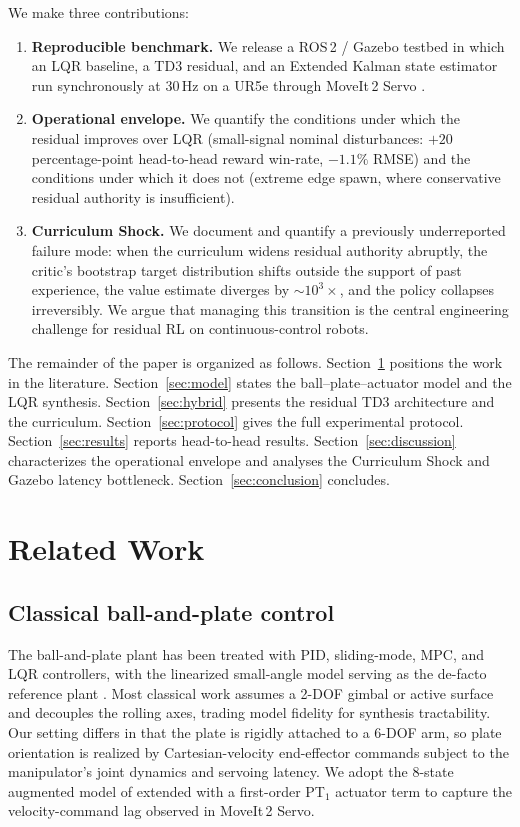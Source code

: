 \documentclass[conference]{IEEEtran}
\begin{document}
We make three contributions:
\begin{enumerate}
  \item \textbf{Reproducible benchmark.} We release a ROS\,2 / Gazebo testbed
        in which an LQR baseline, a TD3 residual, and an Extended Kalman
        state estimator run synchronously at $30\,$Hz on a UR5e through
        MoveIt\,2 Servo \cite{Coleman2014}.
  \item \textbf{Operational envelope.} We quantify the conditions under which
        the residual improves over LQR (small-signal nominal disturbances:
        $+20$ percentage-point head-to-head reward win-rate, $-1.1\%$ RMSE) and the conditions
        under which it does not (extreme edge spawn, where conservative
        residual authority is insufficient).
  \item \textbf{Curriculum Shock.} We document and quantify a previously
        underreported failure mode: when the curriculum widens residual
        authority abruptly, the critic's bootstrap target distribution shifts
        outside the support of past experience, the value estimate diverges
        by $\sim\!10^3\times$, and the policy collapses irreversibly. We
        argue that managing this transition is the central engineering
        challenge for residual RL on continuous-control robots.
\end{enumerate}

The remainder of the paper is organized as follows. Section~\ref{sec:rw}
positions the work in the literature. Section~\ref{sec:model} states the
ball--plate--actuator model and the LQR synthesis. Section~\ref{sec:hybrid}
presents the residual TD3 architecture and the curriculum.
Section~\ref{sec:protocol} gives the full experimental protocol.
Section~\ref{sec:results} reports head-to-head results.
Section~\ref{sec:discussion} characterizes the operational envelope and
analyses the Curriculum Shock and Gazebo latency bottleneck.
Section~\ref{sec:conclusion} concludes.

\section{Related Work}
\label{sec:rw}

\subsection{Classical ball-and-plate control}
The ball-and-plate plant has been treated with PID, sliding-mode, MPC, and
LQR controllers, with the linearized small-angle model serving as the
de-facto reference plant \cite{Awtar2002,Sotnikov2017}. Most classical work
assumes a 2-DOF gimbal or active surface and decouples the rolling axes,
trading model fidelity for synthesis tractability. Our setting differs in
that the plate is rigidly attached to a 6-DOF arm, so plate orientation is
realized by Cartesian-velocity end-effector commands subject to the
manipulator's joint dynamics and servoing latency. We adopt the
8-state augmented model of \cite{Sotnikov2017} extended with a first-order
PT$_1$ actuator term to capture the velocity-command lag observed in
MoveIt\,2 Servo.
\end{document}
